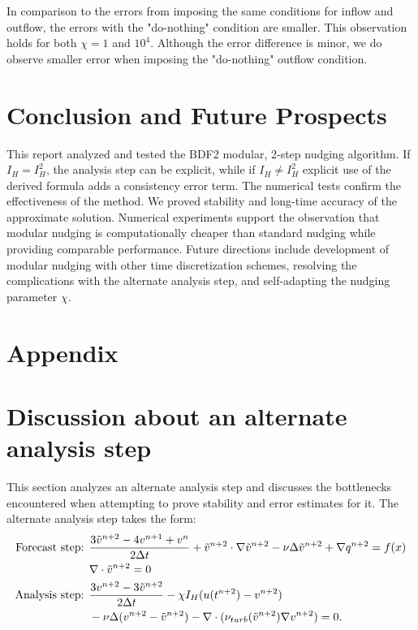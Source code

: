 \documentclass[11pt,a4paper]{article}
\begin{document}
In comparison to the errors from imposing the same conditions for inflow and outflow, the errors with the "do-nothing" condition are smaller. This observation holds for both $\chi=1$ and $10^4$. Although the error difference is minor, we do observe smaller error when imposing the "do-nothing" outflow condition.
  
\section{Conclusion and Future Prospects}
This report analyzed and tested the BDF2 modular, 2-step nudging algorithm. If $I_H=I_H^2$, the analysis step can be explicit, while if $I_H\neq I_H^2$ explicit use of the derived formula adds a consistency error term. The numerical tests confirm the effectiveness of the method. 
We proved stability and long-time accuracy of the approximate solution. Numerical experiments support the observation that modular nudging is computationally cheaper than standard nudging while providing comparable performance. Future directions  include development of modular nudging with other time discretization schemes, resolving the complications with the alternate analysis step, and self-adapting the nudging parameter $\chi$.

\section{Appendix}
\appendix
\section{Discussion about an alternate analysis step}
This section analyzes an alternate analysis step and discusses the bottlenecks encountered when attempting to prove stability and error estimates for it. The alternate analysis step takes the form:
\begin{align}
    \text{Forecast step: } &\frac{3\Tilde{v}^{n+2}-4v^{n+1}+v^n}{2\Delta t}+\tilde{v}^{n+2} \cdot \nabla \Tilde{v}^{n+2} - \nu \Delta \Tilde{v}^{n+2} + \nabla q^{n+2}=f(x) \\ &\nabla \cdot \Tilde{v}^{n+2} = 0 \\
    \text{Analysis step: }
    &\frac{3v^{n+2}-3\Tilde{v}^{n+2}}{2\Delta t}-\chi I_H(u(t^{n+2})-v^{n+2}) \\
    & - \nu \Delta (v^{n+2}-\Tilde{v}^{n+2}) - \nabla \cdot (\nu_{turb}(\Tilde{v}^{n+2})\nabla v^{n+2})=0. \notag
\end{align}
\end{document}
